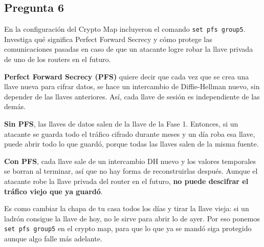 \subsection{Pregunta 6}

En la configuración del Crypto Map incluyeron el comando \texttt{set pfs group5}. Investiga qué significa Perfect Forward Secrecy y cómo protege las comunicaciones pasadas en caso de que un atacante logre robar la llave privada de uno de los routers en el futuro.

\begin{respuesta}
\textbf{Perfect Forward Secrecy (PFS)} quiere decir que cada vez que se crea una
llave nueva para cifrar datos, se hace un intercambio de Diffie-Hellman nuevo,
sin depender de las llaves anteriores. Así, cada llave de sesión es
independiente de las demás.

\textbf{Sin PFS}, las llaves de datos salen de la llave de la Fase 1. Entonces,
si un atacante se guarda todo el tráfico cifrado durante meses y un día roba esa
llave, puede abrir todo lo que guardó, porque todas las llaves salen de la misma
fuente.

\textbf{Con PFS}, cada llave sale de un intercambio DH nuevo y los valores
temporales se borran al terminar, así que no hay forma de reconstruirlas después.
Aunque el atacante robe la llave privada del router en el futuro, \textbf{no
puede descifrar el tráfico viejo que ya guardó}.

Es como cambiar la chapa de tu casa todos los días y tirar la llave vieja: si un
ladrón consigue la llave de hoy, no le sirve para abrir lo de ayer. Por eso
ponemos \texttt{set pfs group5} en el crypto map, para que lo que ya se mandó
siga protegido aunque algo falle más adelante.
\end{respuesta}
